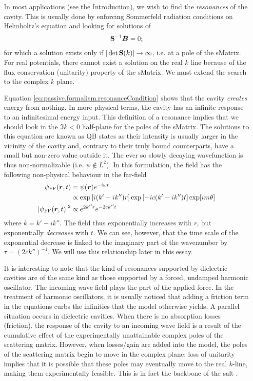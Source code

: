 In most applications (see the Introduction), we wish to find the \textit{resonances} of the
cavity. This is usually done by enforcing Sommerfeld radiation conditions
on Helmholtz's equation and looking for solutions of
  \begin{equation}
   \label{eq:passive.formalism.resonanceCondition}
   \mathbf{S}^{-1}\boldsymbol{B}=0;
  \end{equation}
for which a solution exists only if $|\det{\mathbf{S}(k)}|\rightarrow\infty$, 
i.e. at a pole of the \gls{sMatrix}. 
For real potentials, there cannot exist a solution on the real $k$ line because
of the flux conservation (unitarity) property of the \gls{sMatrix}. We 
must extend the search to the complex $k$ plane.

Equation \eqref{eq:passive.formalism.resonanceCondition} shows that the cavity 
\textit{creates} energy from nothing. In more physical terms, the cavity
has an infinite response to an infinitesimal energy input. This definition
of a resonance implies that we should look in the $\Im{k}<0$ half-plane
for the poles of the \gls{sMatrix}. The solutions to this equation 
are known as QB states as their intensity is usually larger
in the vicinity of the cavity and, contrary to their truly bound counterparts, 
have a small but non-zero value outside it. The ever so slowly decaying wavefunction
is thus non-normalizable (i.e. $\psi\notin L^2$). In this formulation, the field
has the following non-physical behaviour in the far-field
  \begin{align*}
   \psi_\text{FF}(\boldsymbol{r},t) 			&= \psi(\boldsymbol{r})e^{-i\omega t}	\\
						&\propto \exp\left[i(k'-ik'')r\right]\exp\left[-ic(k'-ik'')t\right]\exp[im\theta]	\\
   \left|\psi_\text{FF}(\boldsymbol{r},t)\right|^2 	&\propto e^{2k''r}e^{-2ck''t} 
  \end{align*}
where $k=k'-ik''$. The field thus exponentially increases with $r$, 
but exponentially \textit{decreases} with $t$. We can see, however, 
that the time scale of the exponential decrease is linked to the
imaginary part of the wavenumber by $\tau=\left(2ck''\right)^{-1}$.
We will use this relationship later in this essay.

It is interesting to note that the kind of resonances supported
by dielectric cavities are of the same kind as those supported
by a forced, undamped harmonic oscillator. The incoming wave field
plays the part of the applied force. In the treatment of 
harmonic oscillators, it is usually noticed that adding a friction 
term in the equations curbs the infinities that the model otherwise 
yields. A parallel situation occurs in dielectric cavities. When there
is no absorption losses (friction), the response of the cavity 
to an incoming wave field is a result of the cumulative effect 
of the experimentally unattainable complex poles of the scattering matrix. 
However, when losses/gain are added into the model, the poles of the scattering
matrix begin to move in the complex plane; loss of unitarity implies that
it is possible that these poles may eventually move to the real $k$-line, 
making them experimentally feasible. This is in fact the backbone 
of the \gls{salt} \cite{GE2010a,GE2010b}.

